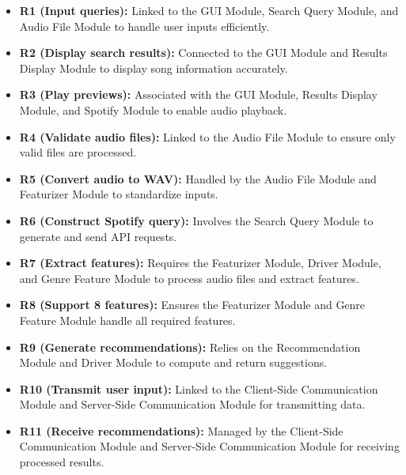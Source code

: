 \documentclass[12pt, titlepage]{article}
\begin{document}
\begin{itemize}
    \item \textbf{R1 (Input queries):} Linked to the GUI Module, Search Query Module, and Audio File Module to handle user inputs efficiently.
    \item \textbf{R2 (Display search results):} Connected to the GUI Module and Results Display Module to display song information accurately.
    \item \textbf{R3 (Play previews):} Associated with the GUI Module, Results Display Module, and Spotify Module to enable audio playback.
    \item \textbf{R4 (Validate audio files):} Linked to the Audio File Module to ensure only valid files are processed.
    \item \textbf{R5 (Convert audio to WAV):} Handled by the Audio File Module and Featurizer Module to standardize inputs.
    \item \textbf{R6 (Construct Spotify query):} Involves the Search Query Module to generate and send API requests.
    \item \textbf{R7 (Extract features):} Requires the Featurizer Module, Driver Module, and Genre Feature Module to process audio files and extract features.
    \item \textbf{R8 (Support 8 features):} Ensures the Featurizer Module and Genre Feature Module handle all required features.
    \item \textbf{R9 (Generate recommendations):} Relies on the Recommendation Module and Driver Module to compute and return suggestions.
    \item \textbf{R10 (Transmit user input):} Linked to the Client-Side Communication Module and Server-Side Communication Module for transmitting data.
    \item \textbf{R11 (Receive recommendations):} Managed by the Client-Side Communication Module and Server-Side Communication Module for receiving processed results.
\end{itemize}
\end{document}
